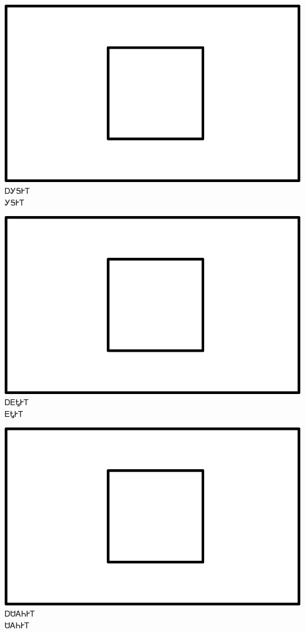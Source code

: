 \documentclass[avery5371]{flashcards}%
\begin{document}
\begin{flashcard}{
\includegraphics[width=0.95\columnwidth,height=.51\columnwidth,keepaspectratio]{../artwork/for-colors/square-white}
}\Huge ᎠᎩᎦᎨᎢ\\ᎩᎦᎨᎢ
\end{flashcard}

\begin{flashcard}{
\includegraphics[width=0.95\columnwidth,height=.51\columnwidth,keepaspectratio]{../artwork/for-colors/square-white}
}\Huge ᎠᎬᎿᎨᎢ\\ᎬᎿᎨᎢ
\end{flashcard}

\begin{flashcard}{
\includegraphics[width=0.95\columnwidth,height=.51\columnwidth,keepaspectratio]{../artwork/for-colors/square-white}
}\Huge ᎠᏌᎪᏂᎨᎢ\\ᏌᎪᏂᎨᎢ
\end{flashcard}
\end{document}
